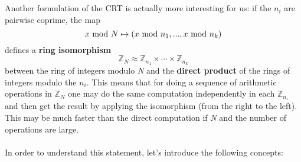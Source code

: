 \newpage
\hfill\break
Another formulation of the CRT is actually more interesting for us: if the $n_i$ are pairwise coprime, the map
$$x\text{ mod } N\mapsto (x\text{ mod } n_1,...,x\text{ mod } n_k)$$
defines a \textbf{ring isomorphism}
$$\mathbb{Z}_N\approx\mathbb{Z}_{n_1}\times\cdots\times\mathbb{Z}_{n_k}$$
between the ring of integers modulo \textit{N} and the \textbf{direct product} of the rings of integers modulo the $n_i$. This means that for doing a sequence of arithmetic operations in $\mathbb{Z}_N$ one may do the same computation independently in each $\mathbb{Z}_{n_i}$ and then get the result by applying the isomorphism (from the right to the left). This may be much faster than the direct computation if \textit{N} and the number of operations are large.\\\\
In order to understand this statement, let's introduce the following concepts:
